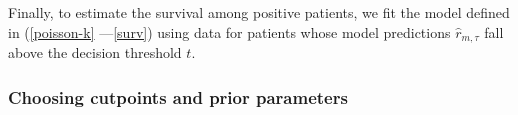 \documentclass{article}
\begin{document}
Finally, to estimate the survival among positive patients, we fit the model defined in (\ref*{poisson-k} ---\ref*{surv}) using
data for patients whose model predictions $\widehat{r}_{m,\tau}$ fall above the decision threshold $t$.
\subsubsection{Choosing cutpoints and prior parameters}




\end{document}

